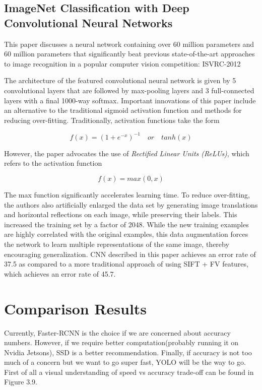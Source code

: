 	\subsection{ImageNet Classification with Deep Convolutional Neural Networks}
		This paper discusses a neural network containing over 60 million parameters and 60 million parameters that significantly beat previous state-of-the-art approaches to image recognition in a popular computer
		vision competition: ISVRC-2012
		
		The architecture of the featured convolutional neural network is given by 5 convolutional layers that are followed by  max-pooling  layers  and  3  full-connected layers with a final 1000-way softmax. Important innovations of this paper include  an  alternative to  the  traditional  sigmoid  activation function and methods for reducing over-fitting. Traditionally,
		activation functions take the form
		
		\begin{equation}
		f(x) = (1+e^{-x})^{-1} \quad or\quad tanh(x)
		\end{equation}
		
		However, the paper advocates the use of \emph{Rectified Linear Units (ReLUs)}, which refers to the activation function
		
		\begin{equation}f(x) = max(0,x) \end{equation}
		
		The max function significantly accelerates learning time. To
		reduce over-fitting, the authors also artificially enlarged the
		data set by generating image translations and horizontal reflections on each image, while preserving their labels. This
		increased the training set by a factor of 2048. While the new
		training examples are highly correlated with the original examples, this data augmentation forces the network to learn multiple representations of the same image, thereby encouraging generalization. CNN described in this paper achieves an error rate of 37.5 as compared to a more traditional approach of using SIFT + FV features, which achieves an error rate of 45.7.
		~\cite{lee2015comparing}
	
	\section{Comparison Results}
	\label{sec:Comparison Results}
		
		 Currently, Faster-RCNN is the choice if we are concerned about accuracy numbers. However, if we require  better computation(probably running it on Nvidia Jetsons), SSD is a better recommendation. Finally, if accuracy is not too much of a concern but we want to go super fast, YOLO will be the way to go. First of all a visual understanding of speed vs accuracy trade-off can be found in Figure 3.9.~\cite{objdet}
		
